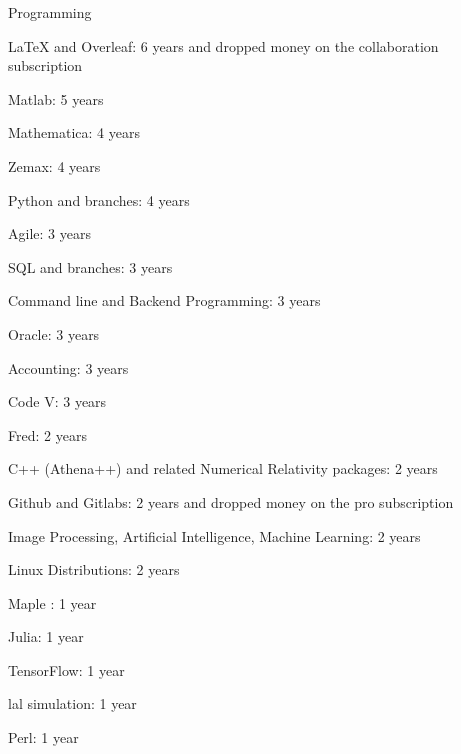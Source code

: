 \begin{cventries}
  \cventry
    {}
    {Programming}
    {}
    {}
    {
      \begin{cvitems}
        \item {LaTeX and Overleaf: 6 years and dropped money on the collaboration subscription}
        \item {Matlab: 5 years }
        \item {Mathematica: 4 years }
        \item {Zemax: 4 years}
        \item {Python and branches: 4 years }
        \item {Agile: 3 years}
        \item {SQL and branches: 3 years }
        \item{Command line and Backend Programming: 3 years}
        \item {Oracle: 3 years}
        \item{Accounting: 3 years}
        \item {Code V: 3 years}
        \item {Fred: 2 years}
        \item{C++ (Athena++) and related Numerical Relativity packages: 2 years}
        \item{Github and Gitlabs: 2 years and dropped money on the pro subscription}
        \item{Image Processing, Artificial Intelligence, Machine Learning: 2 years}
        \item {Linux Distributions: 2 years}
        \item {Maple : 1 year}
        \item{Julia: 1 year}
        \item{TensorFlow: 1 year}
        \item{lal simulation: 1 year}
        \item{Perl: 1 year}
      \end{cvitems}
      }
   

\end{cventries}
